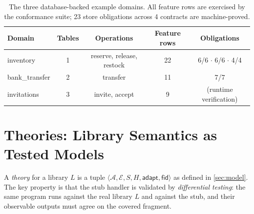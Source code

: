 \documentclass[11pt,a4paper]{article}
\begin{document}
\begin{table}[t]
\centering\small
\begin{tabular}{@{}lcccc@{}}
\toprule
Domain & Tables & Operations & Feature rows & Obligations \\
\midrule
inventory & 1 & reserve, release, restock & 22 & 6/6 $\cdot$ 6/6 $\cdot$ 4/4 \\
bank\_transfer & 2 & transfer & 11 & 7/7 \\
invitations & 3 & invite, accept & 9 & (runtime verification) \\
\bottomrule
\end{tabular}
\caption{The three database-backed example domains.  All feature rows
are exercised by the conformance suite; 23 store obligations across 4
contracts are machine-proved.}
\label{tab:domains}
\end{table}

\section{Theories: Library Semantics as Tested Models}\label{sec:theories}

A \emph{theory} for a library $L$ is a tuple
$\langle \mathcal{A}, \mathcal{E}, S, H, \mathsf{adapt},
\mathsf{fid} \rangle$ as defined in \cref{sec:model}.  The key
property is that the stub handler is validated by
\emph{differential testing}: the same program runs against the real
library $L$ and against the stub, and their observable outputs must
agree on the covered fragment.
\end{document}
